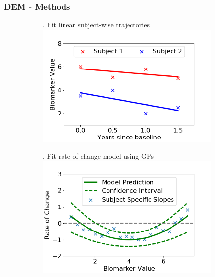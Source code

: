 \documentclass[10pt,xcolor=table]{beamer}
\begin{document}
\begin{frame}
\frametitle{DEM - Methods}

\newcommand{\figScale}{0.27}

\begin{figure}[H]
 \centering
 \begin{subfigure}{0.47\textwidth}
    . Fit linear subject-wise trajectories
    \includegraphics[scale=\figScale]{fig1_linReg.png}
    \vspace{1em}
 \end{subfigure}
 \begin{subfigure}{0.47\textwidth}
     . Fit rate of change model using GPs\\
     \includegraphics[scale=\figScale]{fig2_GP.png}
     \vspace{1em}
 \end{subfigure}
 

\end{figure}
\end{frame}
\end{document}
